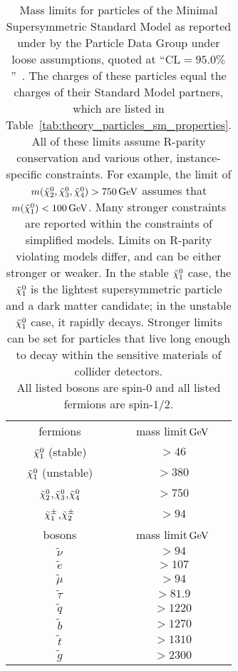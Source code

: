 \begin{table}[tp]
\centering
\begin{tabular}{cc}
fermions                                        & mass limit$\,\eV[G]$ \\[0.2em]
$\neutralino_1$ (stable)                        & $> 46$         \\
$\neutralino_1$ (unstable)                      & $> 380$        \\
$\neutralino_2$,$\neutralino_3$,$\neutralino_4$ & $> 750$        \\
$\chargino_1$,$\chargino_2$                     & $> 94$         \\[1em]
bosons                                          & mass limit$\,\eV[G]$ \\[0.2em]
$\tilde \nu$                                    & $> 94$         \\
$\tilde e$                                      & $> 107$        \\
$\tilde \mu$                                    & $> 94$         \\
$\tilde \tau$                                   & $> 81.9$       \\
$\tilde q$                                      & $> 1220$       \\
$\tilde b$                                      & $> 1270$       \\
$\tilde t$                                      & $> 1310$       \\
$\tilde g$                                      & $> 2300$
\end{tabular}
\caption[%
Mass limits for particles of the Minimal Supersymmetric Standard Model%
]{%
Mass limits for particles of the Minimal Supersymmetric Standard Model as
reported under by the Particle Data Group under loose
assumptions, quoted at ``$\mathrm{CL}=95.0\%$''~\cite{pdg2022ynf}.
The charges of these particles equal the charges of their Standard Model
partners, which are listed in
Table~\ref{tab:theory_particles_sm_properties}.
\\[0.4em]
All of these limits assume R-parity conservation and various other,
instance-specific constraints.
For example, the limit of
$m(\neutralino_2,\neutralino_3,\neutralino_4) > 750\,\eV[G]$
assumes that $m(\neutralino_1) < 100\,\eV[G]$.
Many stronger constraints are reported within the constraints of simplified
models.
Limits on R-parity violating models differ, and can be either stronger or
weaker.
In the stable $\neutralino_1$ case, the $\neutralino_1$ is the lightest
supersymmetric particle and a dark matter candidate;
in the unstable $\neutralino_1$ case, it rapidly decays.
Stronger limits can be set for particles that live long enough to decay within
the sensitive materials of collider detectors.
\\[0.4em]
All listed bosons are spin-$0$ and all listed fermions are spin-$1/2$.
}
\label{tab:theory_particles_mssm_mass_limits}
\end{table}


